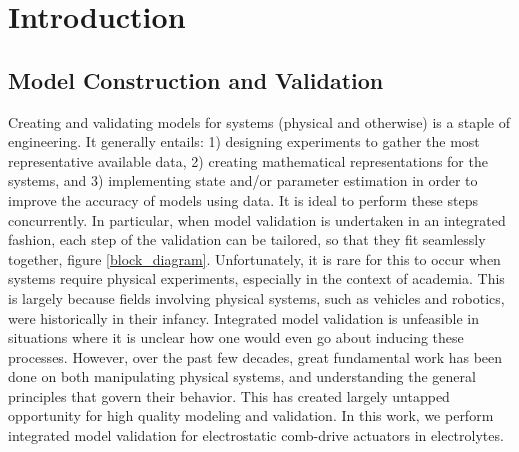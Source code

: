 \chapter{Introduction}  %

\ifpdf
    \graphicspath{{Chapter1/Figs/Raster/}{Chapter1/Figs/PDF/}{Chapter1/Figs/}}
\else
    \graphicspath{{Chapter1/Figs/Vector/}{Chapter1/Figs/}}
\fi


\section{Model Construction and Validation} %

Creating and validating models for systems (physical and otherwise) is a staple of engineering. It generally entails: 1) designing experiments to gather the most representative available data, 2) creating mathematical representations for the systems, and 3) implementing state and/or parameter estimation in order to improve the accuracy of models using data. It is ideal to perform these steps concurrently. In particular, when model validation is undertaken in an integrated fashion, each step of the validation can be tailored, so that they fit seamlessly together, figure \ref{block_diagram}. Unfortunately, it is rare for this to occur when systems require physical experiments, especially in the context of academia. This is largely because fields involving physical systems, such as vehicles and robotics, were historically in their infancy. Integrated model validation is unfeasible in situations where it is unclear how one would even go about inducing these processes. However, over the past few decades, great fundamental work has been done on both manipulating physical systems, and understanding the general principles that govern their behavior. This has created largely untapped opportunity for high quality modeling and validation. In this work, we perform integrated model validation for electrostatic comb-drive actuators in electrolytes. \\

